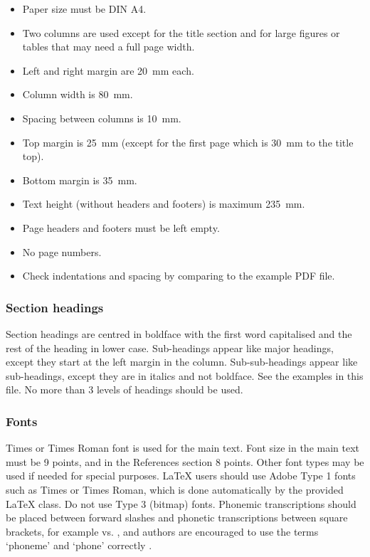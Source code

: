 \documentclass{Interspeech2024}
\begin{document}
\begin{itemize}
\item Paper size must be DIN A4.
\item Two columns are used except for the title section and for large figures or tables that may need a full page width.
\item Left and right margin are \SI{20}{\milli\metre} each. 
\item Column width is \SI{80}{\milli\metre}. 
\item Spacing between columns is \SI{10}{\milli\metre}.
\item Top margin is \SI{25}{\milli\metre} (except for the first page which is \SI{30}{\milli\metre} to the title top).
\item Bottom margin is \SI{35}{\milli\metre}.
\item Text height (without headers and footers) is maximum \SI{235}{\milli\metre}.
\item Page headers and footers must be left empty.
\item No page numbers.
\item Check indentations and spacing by comparing to the example PDF file.
\end{itemize}

\subsubsection{Section headings}

Section headings are centred in boldface with the first word capitalised and the rest of the heading in lower case. Sub-headings appear like major headings, except they start at the left margin in the column. Sub-sub-headings appear like sub-headings, except they are in italics and not boldface. See the examples in this file. No more than 3 levels of headings should be used.

\subsubsection{Fonts}

Times or Times Roman font is used for the main text. Font size in the main text must be 9 points, and in the References section 8 points. Other font types may be used if needed for special purposes. \LaTeX\xspace users should use Adobe Type 1 fonts such as Times or Times Roman, which is done automatically by the provided \LaTeX\xspace class. Do not use Type 3 (bitmap) fonts. Phonemic transcriptions should be placed between forward slashes and phonetic transcriptions between square brackets, for example  vs. \textipa{[lO:r@nO:d@]}, and authors are encouraged to use the terms `phoneme' and `phone' correctly \cite{moore19_interspeech}.
\end{document}
